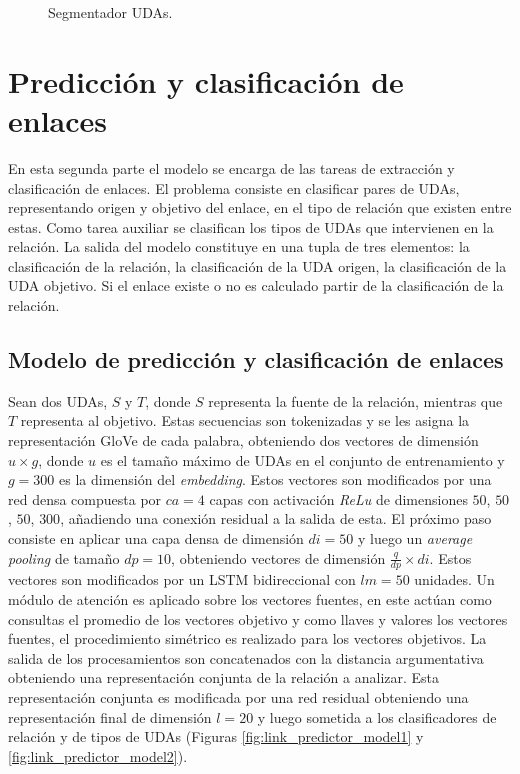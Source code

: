 \documentclass[a4paper,11pt,twocolumn,twoside]{article}
\begin{document}
\begin{figure}[h]
    \centering
    
    \caption{Segmentador UDAs.}
    \label{fig:segmenter_model}
\end{figure}

\newpage

\section{Predicción y clasificación de enlaces}

En esta segunda parte el modelo se encarga de las tareas de extracción y clasificación de enlaces.
El problema consiste en clasificar pares de UDAs, representando origen y objetivo del enlace, 
en el tipo de relación que existen entre estas.
Como tarea auxiliar se clasifican los tipos de UDAs que intervienen en la relación. La salida 
del modelo constituye en una tupla de tres elementos: la clasificación de la relación, 
la clasificación de la UDA origen, la clasificación de la UDA objetivo. Si el enlace existe o no 
es calculado partir de la clasificación de la relación.   

\subsection{Modelo de predicción y clasificación de enlaces}

Sean dos UDAs, $S$ y $T$, donde $S$ representa la fuente de la relación, mientras que $T$ representa
al objetivo. Estas secuencias son tokenizadas y se les asigna la representación GloVe de cada palabra, obteniendo
dos vectores de dimensión $u \times g$, donde $u$ es el tamaño máximo de UDAs en el conjunto de entrenamiento
y $g=300$ es la dimensión del \textit{embedding}.
Estos vectores son modificados por una red densa compuesta por $ca = 4$ capas con activación \textit{ReLu}
de dimensiones $50$, $50$, $50$, $300$, añadiendo una conexión residual a la salida de esta. 
El próximo paso consiste en aplicar una capa densa de dimensión $di=50$ y luego un \textit{average pooling}
de tamaño $dp=10$, obteniendo vectores de dimensión $\frac{q}{dp} \times di$. 
Estos vectores son modificados por un LSTM bidireccional con $lm=50$ unidades. Un módulo de atención es aplicado 
sobre los vectores fuentes, 
en este actúan como consultas el promedio de los vectores objetivo y como llaves y valores los vectores fuentes,
el procedimiento simétrico es realizado para los vectores objetivos.
La salida de los procesamientos son concatenados con la distancia argumentativa obteniendo una representación 
conjunta de la relación a analizar. Esta representación conjunta es modificada por una red residual obteniendo
una representación final de dimensión $l=20$ y luego sometida a los clasificadores de relación y de tipos de UDAs
(Figuras \ref{fig:link_predictor_model1} y \ref{fig:link_predictor_model2}).
\end{document}
